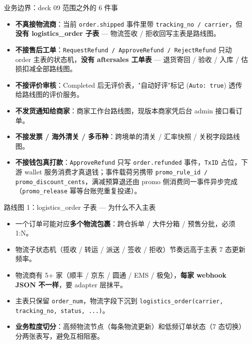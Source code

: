\documentclass[aspectratio=169,11pt]{beamer}
\begin{document}
\begin{frame}[shrink]{业务边界：deck 09 范围之外的 6 件事}
\begin{itemize}
  \item \textbf{不真接物流商}：当前 \texttt{order.shipped} 事件里带 \texttt{tracking\_no / carrier}，但\textbf{没有 logistics\_order 子表} — 物流签收 / 拒收回写主表是路线图。
  \item \textbf{不接售后工单}：\texttt{RequestRefund / ApproveRefund / RejectRefund} 只动 order 主表的状态机，\textbf{没有 aftersales 工单表} — 退货寄回 / 验收 / 入库 / 估损扣减全部路线图。
  \item \textbf{不接评价审核}：Completed 后无评价表，"自动好评"标记 (\texttt{Auto: true}) 透传给路线图的评价服务。
  \item \textbf{不发货通知给商家}：商家工作台路线图，现版本商家凭后台 admin 接口看订单。
  \item \textbf{不接发票 / 海外清关 / 多币种}：跨境单的清关 / 汇率快照 / 关税字段路线图。
  \item \textbf{不接钱包真打款}：\texttt{ApproveRefund} 只写 \texttt{order.refunded} 事件，\texttt{TxID} 占位，下游 wallet 服务消费才真退钱；事件载荷另携带 \texttt{promo\_rule\_id / promo\_discount\_cents}，满减预算退还由 promo 侧消费同一事件异步完成（\texttt{promo\_release} 幂等台账兜重复投递）。
\end{itemize}
\end{frame}

\begin{frame}[shrink]{路线图 1：logistics\_order 子表 — 为什么不入主表}
\begin{itemize}
  \item 一个订单可能对应\textbf{多个物流包裹}：跨仓拆单 / 大件分箱 / 预售分批，必须 1:N。
  \item 物流子状态机（揽收 / 转运 / 派送 / 签收 / 拒收）节奏远高于主表 7 态更新频率。
  \item 物流商有 5+ 家（顺丰 / 京东 / 圆通 / EMS / 极兔），\textbf{每家 webhook JSON 不一样}，要 adapter 层抹平。
  \item 主表只保留 \texttt{order\_num}，物流字段下沉到 \texttt{logistics\_order(carrier, tracking\_no, status, ...)}。
  \item \textbf{业务粒度切分}：高频物流节点（每条物流更新）和低频订单状态（7 态切换）分两张表写，避免互相阻塞。
\end{itemize}
\end{frame}
\end{document}
